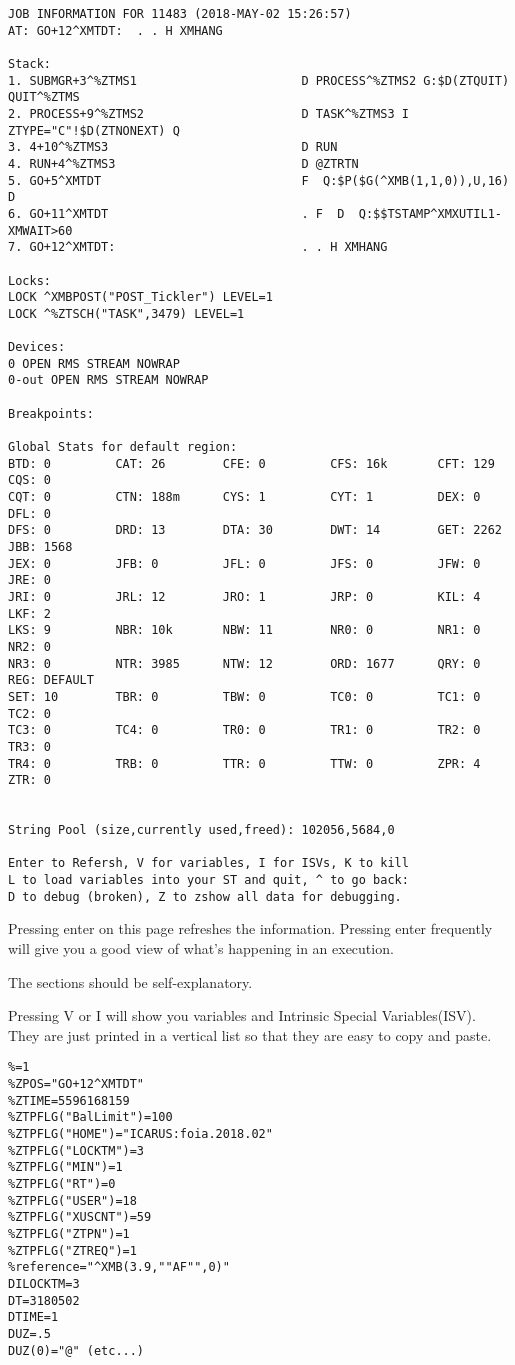 \documentclass[]{article}
\begin{document}
\begin{lstlisting}
JOB INFORMATION FOR 11483 (2018-MAY-02 15:26:57)
AT: GO+12^XMTDT:  . . H XMHANG

Stack: 
1. SUBMGR+3^%ZTMS1                       D PROCESS^%ZTMS2 G:$D(ZTQUIT) QUIT^%ZTMS
2. PROCESS+9^%ZTMS2                      D TASK^%ZTMS3 I ZTYPE="C"!$D(ZTNONEXT) Q
3. 4+10^%ZTMS3                           D RUN
4. RUN+4^%ZTMS3                          D @ZTRTN
5. GO+5^XMTDT                            F  Q:$P($G(^XMB(1,1,0)),U,16)  D
6. GO+11^XMTDT                           . F  D  Q:$$TSTAMP^XMXUTIL1-XMWAIT>60
7. GO+12^XMTDT:                          . . H XMHANG

Locks: 
LOCK ^XMBPOST("POST_Tickler") LEVEL=1
LOCK ^%ZTSCH("TASK",3479) LEVEL=1

Devices: 
0 OPEN RMS STREAM NOWRAP 
0-out OPEN RMS STREAM NOWRAP 

Breakpoints: 

Global Stats for default region: 
BTD: 0         CAT: 26        CFE: 0         CFS: 16k       CFT: 129       CQS: 0 
CQT: 0         CTN: 188m      CYS: 1         CYT: 1         DEX: 0         DFL: 0 
DFS: 0         DRD: 13        DTA: 30        DWT: 14        GET: 2262      JBB: 1568 
JEX: 0         JFB: 0         JFL: 0         JFS: 0         JFW: 0         JRE: 0 
JRI: 0         JRL: 12        JRO: 1         JRP: 0         KIL: 4         LKF: 2 
LKS: 9         NBR: 10k       NBW: 11        NR0: 0         NR1: 0         NR2: 0 
NR3: 0         NTR: 3985      NTW: 12        ORD: 1677      QRY: 0         REG: DEFAULT 
SET: 10        TBR: 0         TBW: 0         TC0: 0         TC1: 0         TC2: 0 
TC3: 0         TC4: 0         TR0: 0         TR1: 0         TR2: 0         TR3: 0 
TR4: 0         TRB: 0         TTR: 0         TTW: 0         ZPR: 4         ZTR: 0 


String Pool (size,currently used,freed): 102056,5684,0

Enter to Refersh, V for variables, I for ISVs, K to kill
L to load variables into your ST and quit, ^ to go back: 
D to debug (broken), Z to zshow all data for debugging.
\end{lstlisting}

Pressing enter on this page refreshes the information. Pressing enter frequently will give you a good view of what's happening in an execution.

The sections should be self-explanatory.

Pressing V or I will show you variables and Intrinsic Special Variables(ISV). They are just printed in a vertical list so that they are easy to copy and paste.
\lstset{
	caption=Variable List
}
\begin{lstlisting}
%=1
%ZPOS="GO+12^XMTDT"
%ZTIME=5596168159
%ZTPFLG("BalLimit")=100
%ZTPFLG("HOME")="ICARUS:foia.2018.02"
%ZTPFLG("LOCKTM")=3
%ZTPFLG("MIN")=1
%ZTPFLG("RT")=0
%ZTPFLG("USER")=18
%ZTPFLG("XUSCNT")=59
%ZTPFLG("ZTPN")=1
%ZTPFLG("ZTREQ")=1
%reference="^XMB(3.9,""AF"",0)"
DILOCKTM=3
DT=3180502
DTIME=1
DUZ=.5
DUZ(0)="@" (etc...)
\end{lstlisting}
\end{document}
